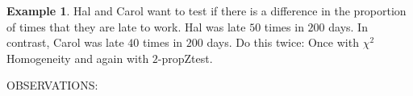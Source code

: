 \documentclass[12pt]{amsart}
\theoremstyle{definition}
\newtheorem{ex}{Example}
\begin{document}
\begin{ex}
 Hal and Carol want to test if there is a difference in the proportion of times that they are late to work. Hal was late $50$ times in $200$ days. In contrast, Carol was late $40$ times in $200$ days. Do this twice: Once with $\chi^2$ Homogeneity and again with $2$-propZtest.
\end{ex}
\vfill
OBSERVATIONS:
\end{document}
